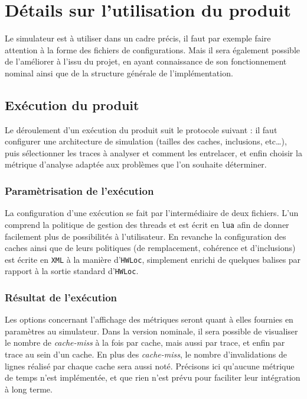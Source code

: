 \section{Détails sur l'utilisation du produit}

Le simulateur est à utiliser dans un cadre précis, il faut par exemple faire attention à la forme des fichiers de configurations. Mais il sera également possible de l'améliorer à l'issu du projet, en ayant connaissance de son fonctionnement nominal ainsi que de la structure générale de l'implémentation.

\subsection{Exécution du produit}

Le déroulement d'un exécution du produit suit le protocole suivant : il faut configurer une architecture de simulation (tailles des caches, inclusions, etc\ldots), puis sélectionner les traces à analyser et comment les entrelacer, et enfin choisir la métrique d'analyse adaptée aux problèmes que l'on souhaite déterminer.

\subsubsection{Paramètrisation de l'exécution}

La configuration d'une exécution se fait par l'intermédiaire de deux fichiers. L'un comprend la politique de gestion des threads et est écrit en \texttt{lua} afin de donner facilement plus de possibilités à l'utilisateur. En revanche la configuration des caches ainsi que de leurs politiques (de remplacement, cohérence et d'inclusions) est écrite en \texttt{XML} à la manière d'\texttt{HWLoc}, simplement enrichi de quelques balises par rapport à la sortie standard d'\texttt{HWLoc}.

\subsubsection{Résultat de l'exécution}
\label{métriques}

Les options concernant l'affichage des métriques seront quant à elles fournies en paramètres au simulateur. Dans la version nominale, il sera possible de visualiser le nombre de \emph{cache-miss} à la fois par cache, mais aussi par trace, et enfin par trace au sein d'un cache. En plus des \emph{cache-miss}, le nombre d'invalidations de lignes réalisé par chaque cache sera aussi noté. Précisons ici qu'aucune métrique de temps n'est implémentée, et que rien n'est prévu pour faciliter leur intégration à long terme.


